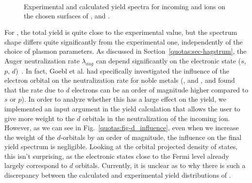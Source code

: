 \begin{refsection}
\begin{figure}[!ht] 
    \centering 
    \captionsetup{width=0.9\textwidth}
    \begin{subfigure}[t]{0.49\textwidth} 
        \centering 
         
    \end{subfigure}%
    ~  
    \begin{subfigure}[t]{0.49\textwidth} 
        \centering 
         
    \end{subfigure} 
    \begin{subfigure}[t]{0.49\textwidth} 
        \centering 
         
    \end{subfigure}%
    ~  
    \begin{subfigure}[t]{0.49\textwidth} 
        \centering 
         
    \end{subfigure} 
    \begin{subfigure}[t]{0.49\textwidth} 
        \centering 
         
    \end{subfigure}%
    ~  
    \begin{subfigure}[t]{0.49\textwidth} 
        \centering 
         
    \end{subfigure} 
    \caption{\label{quotas:fig-metals_results2} Experimental and calculated 
yield spectra for incoming  and  ions on the chosen surfaces of ,  and .} 
\end{figure} \clearpage 
 
For , the total yield is quite close to the experimental value, 
but the spectrum shape differs quite significantly from the experimental one, 
independently of the choice of plasmon parameters. As discussed in 
Section~\ref{quotas:sec-hagstrum}, the Auger neutralization rate 
$\lambda_{aug}$ can depend significantly on the electronic state ($s$, $p$, 
$d$)~\cite{Goebl2011}. In fact, Goebl et al. had specifically investigated the 
influence of the electron orbital on the neutralization rate for noble metals 
(,  and , and found that the rate due to $d$ electrons 
can be an order of magnitude higher compared to $s$ or $p$). In order to 
analyze whether this has a large effect on the yield, we implemented an input 
argument in the yield calculation that allows the user to give more weight to 
the $d$ orbitals in the neutralization of the incoming ion. However, as we can 
see in Fig.~\ref{quotas:fig-d_influence}, even when we increase the weight of 
the $d$-orbitals by an order of magnitude, the influence on the final yield 
spectrum is negligible. Looking at the orbital projected density of states, 
this isn't surprising, as the electronic states close to the Fermi level 
already largely correspond to $d$ orbitals. Currently, it is unclear as to why 
there is such a discrepancy between the calculated and experimental yield 
distributions of . 


\end{refsection}
